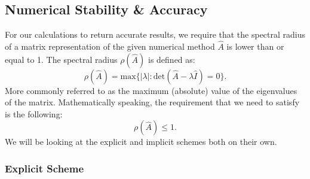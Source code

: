 \documentclass[reprint,english,notitlepage]{revtex4-1}  %
\begin{document}
\subsection{Numerical Stability \& Accuracy}

For our calculations to return accurate results, we require that the spectral radius of a matrix representation of the given numerical method $\hat{A}$ is lower than or equal to 1. The spectral radius $\rho(\hat{A})$ is defined as:
\begin{equation}
    \rho(\hat{A}) = \text{max}\Big\{|\lambda|:\text{det}(\hat{A}-\lambda\hat{I}) = 0\Big\}.
\end{equation}
More commonly referred to as the maximum (absolute) value of the eigenvalues of the matrix. Mathematically speaking, the requirement that we need to satisfy is the following:
\begin{equation}
    \rho(\hat{A}) \leq 1.
\end{equation}
We will be looking at the explicit and implicit schemes both on their own.

\subsubsection{Explicit Scheme}
\end{document}
